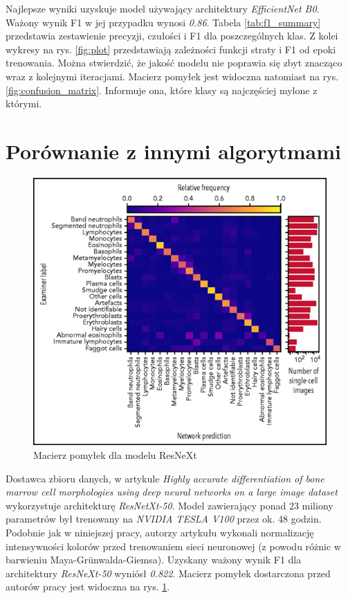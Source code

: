 Najlepsze wyniki uzyskuje model używający architektury \textit{EfficientNet B0}. Ważony wynik F1 w jej przypadku wynosi \textit{0.86}.
Tabela \ref{tab:f1_summary} przedstawia zestawienie precyzji, czułości i F1 dla poszczególnych klas.
Z kolei wykresy na rys. \ref{fig:plot} przedstawiają zależności funkcji straty i F1 od epoki trenowania.
Można stwierdzić, że jakość modelu nie poprawia się zbyt znacząco wraz z kolejnymi iteracjami.
Macierz pomyłek jest widoczna natomiast na rys. \ref{fig:confusion_matrix}.
Informuje ona, które klasy są najczęściej mylone z którymi.

\section{Porównanie z innymi algorytmami}

\begin{figure}
    \centering
    \includegraphics[width=\textwidth]{resnext_confusion_matrix}
    \caption{Macierz pomyłek dla modelu ResNeXt}
    \label{fig:resnext_confusion_matrix}
\end{figure}

Dostawca zbioru danych, w artykule \textit{Highly accurate differentiation of bone marrow cell morphologies using deep neural networks on a large image dataset} \cite{resnext} wykorzystuje architekturę \textit{ResNetXt-50}.
Model zawierający ponad 23 miliony parametrów był trenowany na \textit{NVIDIA TESLA V100} przez ok. 48 godzin.
Podobnie jak w niniejszej pracy, autorzy artykułu wykonali normalizację intensywności kolorów przed trenowaniem sieci neuronowej (z powodu różnic w barwieniu Maya-Grünwalda-Giemsa).
Uzyskany ważony wynik F1 dla architektury \textit{ResNeXt-50} wyniósł \textit{0.822}. Macierz pomyłek dostarczona przed autorów pracy jest widoczna na rys. \ref{fig:resnext_confusion_matrix}.

